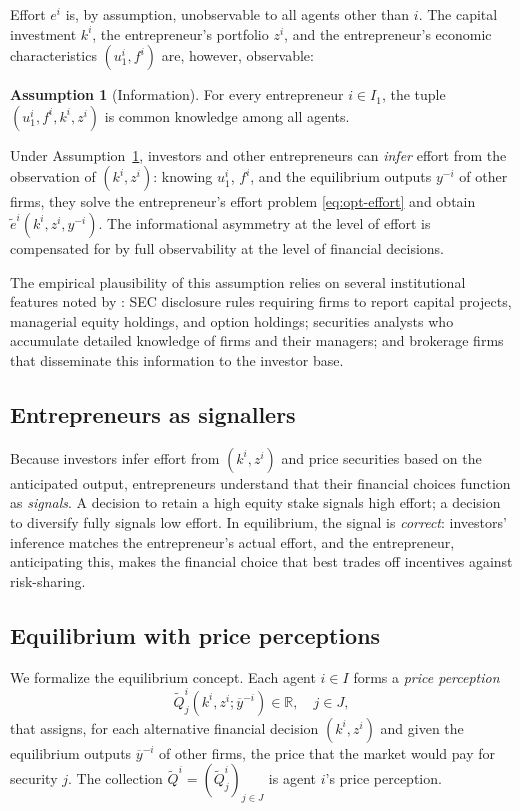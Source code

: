 \documentclass[11pt,a4paper,oneside]{book}
\def\R{\mathbb{R}}
\theoremstyle{plain}
\theoremstyle{definition}
\newtheorem{assumption}[theorem]{Assumption}
\theoremstyle{remark}
\numberwithin{equation}{chapter}
\begin{document}
Effort $e^i$ is, by assumption, unobservable to all agents other than $i$.
The capital investment $k^i$, the entrepreneur's portfolio $z^i$, and the entrepreneur's economic characteristics $(u^i_1, f^i)$ are, however, observable:

\begin{assumption}[Information]\label{ass:MH-info}
For every entrepreneur $i \in I_1$, the tuple $(u^i_1, f^i, k^i, z^i)$ is common knowledge among all agents.
\end{assumption}

Under Assumption~\ref{ass:MH-info}, investors and other entrepreneurs can \emph{infer} effort from the observation of $(k^i, z^i)$: knowing $u^i_1$, $f^i$, and the equilibrium outputs $y^{-i}$ of other firms, they solve the entrepreneur's effort problem \eqref{eq:opt-effort} and obtain $\widetilde{e}^i(k^i, z^i, y^{-i})$.
The informational asymmetry at the level of effort is compensated for by full observability at the level of financial decisions.

The empirical plausibility of this assumption relies on several institutional features noted by \citet{MagillQuinzii2002}: SEC disclosure rules requiring firms to report capital projects, managerial equity holdings, and option holdings; securities analysts who accumulate detailed knowledge of firms and their managers; and brokerage firms that disseminate this information to the investor base.

\subsection{Entrepreneurs as signallers}

Because investors infer effort from $(k^i, z^i)$ and price securities based on the anticipated output, entrepreneurs understand that their financial choices function as \emph{signals}.
A decision to retain a high equity stake signals high effort; a decision to diversify fully signals low effort.
In equilibrium, the signal is \emph{correct}: investors' inference matches the entrepreneur's actual effort, and the entrepreneur, anticipating this, makes the financial choice that best trades off incentives against risk-sharing.

\subsection{Equilibrium with price perceptions}

We formalize the equilibrium concept.
Each agent $i \in I$ forms a \emph{price perception}
\begin{equation*}
  \widetilde{Q}^i_j(k^i, z^i; \overline{y}^{-i}) \in \R,
  \quad j \in J,
\end{equation*}
that assigns, for each alternative financial decision $(k^i, z^i)$ and given the equilibrium outputs $\overline{y}^{-i}$ of other firms, the price that the market would pay for security $j$.
The collection $\widetilde{Q}^i = (\widetilde{Q}^i_j)_{j \in J}$ is agent $i$'s price perception.
\end{document}
